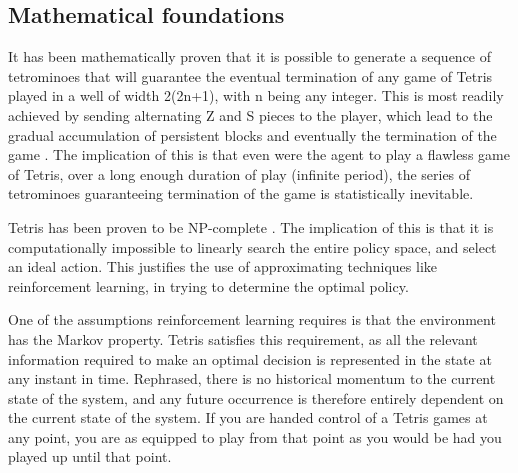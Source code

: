 \documentclass[a4paper]{article}%
\begin{document}
\subsection{Mathematical foundations}

It has been mathematically proven \citep{mathproof,losetetris} that it is possible to generate a sequence of tetrominoes that will guarantee the eventual termination of any game of Tetris played in a well of width 2(2n+1), with n being any integer. This is most readily achieved by sending alternating Z and S pieces to the player, which lead to the gradual accumulation of persistent blocks and eventually the termination of the game \citep[Chpt. 5]{mathproof}. The implication of this is that even were the agent to play a flawless game of Tetris, over a long enough duration of play (infinite period), the series of tetrominoes guaranteeing termination of the game is statistically inevitable.

Tetris has been proven to be NP-complete \citep{hardtet}. The implication of this is that it is computationally impossible to linearly search the entire policy space, and select an ideal action. This justifies the use of approximating techniques like reinforcement learning, in trying to determine the optimal policy.

One of the assumptions reinforcement learning requires is that the environment has the Markov property\citep{suttonbarto}. Tetris satisfies this requirement, as all the relevant information required to make an optimal decision is represented in the state at any instant in time. Rephrased, there is no historical momentum to the current state of the system, and any future occurrence is therefore entirely dependent on the current state of the system. If you are handed control of a Tetris games at any point, you are as equipped to play from that point as you would be had you played up until that point.

\end{document}
